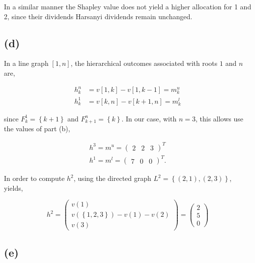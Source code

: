 \documentclass[american]{scrartcl}
\newcommand{\set}[1]{\left\{#1\right\}}
\begin{document}
In a similar manner the Shapley value does not yield a higher allocation for 1 and 2, since their dividends Harsanyi dividends remain unchanged.

\subsection*{(d)}


In a line graph $[1, n]$, the hierarchical outcomes associated with roots $1$ and $n$ are,

\begin{equation}
    \begin{split}
        h^n_k &= v[1, k] - v[1, k - 1] = m^u_k \\
        h^1_k &= v[k, n] - v[k+1, n] = m^l_k
    \end{split}
\end{equation}

since $F^1_k = \set{k + 1}$ and $F^n_{k + 1} = \set{k}$. In our case, with $n = 3$, this allows use the values of part (b),

\begin{equation}
    \begin{split}
        h^3 = m^u = \begin{pmatrix}
            2 &
            2 &
            3
        \end{pmatrix}^T \\
        h^1 = m^l = \begin{pmatrix}
            7 &
            0 &
            0
        \end{pmatrix}^T.
    \end{split}
\end{equation}

In order to compute $h^2$, using the directed graph $L^2 = \set{(2, 1), (2, 3)}$, yields,

\begin{equation}
    h^2 = \begin{pmatrix}
        v(1) \\ v(\set{1,2,3}) - v(1) - v(2) \\ v(3)
    \end{pmatrix} = \begin{pmatrix}
        2 \\ 5 \\ 0
    \end{pmatrix}
\end{equation}

\subsection*{(e)}
\end{document}
